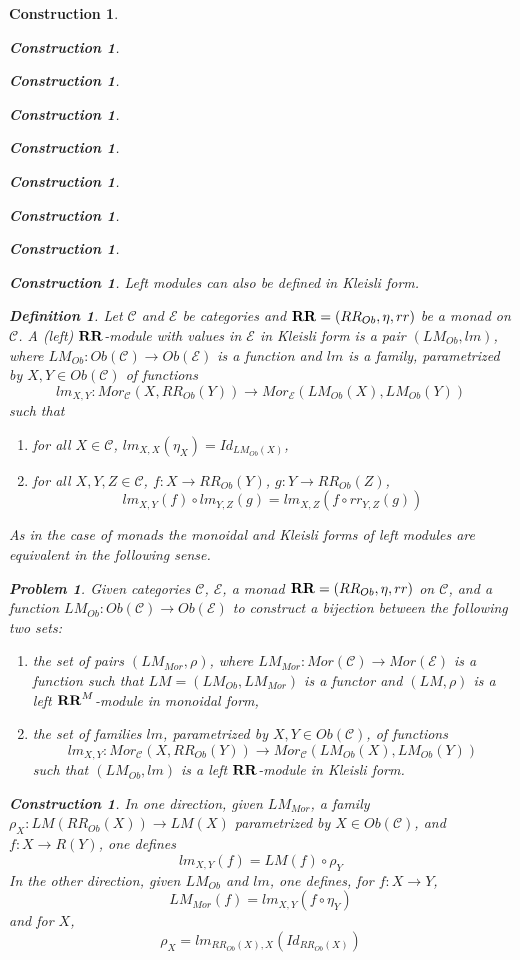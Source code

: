 \documentclass[12pt]{amsart}
\newtheorem{definition}[proposition]{Definition}
\numberwithin{proposition}{subsection}
\newtheorem{problem}[proposition]{Problem}
\newtheorem{construction}[proposition]{Construction}
\newcommand{\llabel}[1]{\label{#1}}
\newcommand{\sr}{\rightarrow}
\newcommand{\RR}{{\bf RR}}
\newcommand{\C}{{\mathcal C}}
\newcommand{\E}{{\mathcal E}}
\begin{document}
\begin{construction}
\begin{construction}
\begin{construction}
\begin{construction}
\begin{construction}
\begin{construction}
\begin{construction}
\begin{construction}
\begin{construction}
Left modules can also be defined in Kleisli form. 
%
\begin{definition}
\llabel{2017.04.15.def1} 
Let $\C$ and $\E$ be categories and
$\RR=(RR_{Ob},\eta,rr)$ be a monad on $\C$. A {\em (left) $\RR$-module with values in
$\E$ in Kleisli form} is a pair $(LM_{Ob},lm)$, where $LM_{Ob}:Ob(\C)\sr
Ob(\E)$ is a function and $lm$ is a family, parametrized by $X,Y\in Ob(\C)$ of
functions
%
$$lm_{X,Y}:Mor_{\C}(X,RR_{Ob}(Y))\sr Mor_{\E}(LM_{Ob}(X),LM_{Ob}(Y))$$
%
such that
%
\begin{enumerate}
\item for all $X\in\C$, $lm_{X,X}(\eta_X)=Id_{LM_{Ob}(X)}$,
\item for all $X,Y,Z\in\C$, $f:X\sr RR_{Ob}(Y)$, $g:Y\sr RR_{Ob}(Z)$, 
%
$$lm_{X,Y}(f)\circ lm_{Y,Z}(g)=lm_{X,Z}(f\circ rr_{Y,Z}(g))$$
\end{enumerate}
\end{definition}
%
As in the case of monads the monoidal and Kleisli forms of left modules are
equivalent in the following sense.
%
\begin{problem}
\llabel{2017.04.03.prob1} 
Given categories $\C$, $\E$, a monad
$\RR=(RR_{Ob},\eta,rr)$ on $\C$, and a function $LM_{Ob}:Ob(\C)\sr Ob(\E)$ to
construct a bijection between the following two sets:
%
\begin{enumerate}
\item the set of pairs $(LM_{Mor},\rho)$, where $LM_{Mor}:Mor(\C)\sr Mor(\E)$ is
  a function such that $LM=(LM_{Ob},LM_{Mor})$ is a functor and $(LM,\rho)$ is
  a left $\RR^M$-module in monoidal form,
\item the set of families $lm$, parametrized by $X,Y\in Ob(\C)$, of functions
%
$$lm_{X,Y}:Mor_{\C}(X,RR_{Ob}(Y))\sr Mor_{\C}(LM_{Ob}(X),LM_{Ob}(Y))$$
%
such that $(LM_{Ob},lm)$ is a left $\RR$-module in Kleisli form. 
\end{enumerate}
\end{problem}
%
\begin{construction}\rm\llabel{2017.04.03.constr1}
In one direction, given $LM_{Mor}$, a family $\rho_X:LM(RR_{Ob}(X))\sr LM(X)$
parametrized by $X\in Ob(\C)$, and $f:X\sr R(Y)$, one defines
%
\begin{equation}\llabel{2017.04.09.eq4}
lm_{X,Y}(f)=LM(f)\circ \rho_Y
\end{equation}%
%
In the other direction, given $LM_{Ob}$ and $lm$, one defines, for $f:X\sr Y$, 
%
\begin{equation}\llabel{2017.04.09.eq3}
LM_{Mor}(f)=lm_{X,Y}(f\circ \eta_Y)
\end{equation}%
%
and for $X$, 
%
$$\rho_X=lm_{RR_{Ob}(X),X}(Id_{RR_{Ob}(X)})$$


\end{construction}
\end{construction}
\end{construction}
\end{construction}
\end{construction}
\end{construction}
\end{construction}
\end{construction}
\end{construction}
\end{construction}
\end{document}
